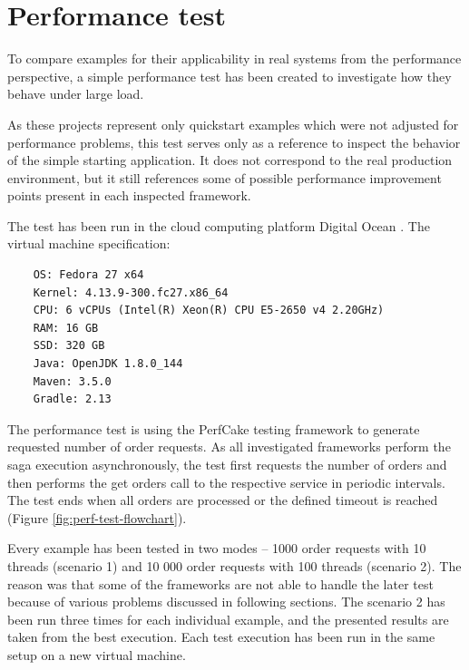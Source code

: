 \documentclass[oneside,
  digital, %
  table,   %
  lof,     %
  lot,     %
]{fithesis3}
\begin{document}
\section{Performance test}
\label{sec:perftest}

To compare examples for their applicability in real systems from the performance perspective, a simple performance test has been created to investigate how they behave under large load.

As these projects represent only quickstart examples which were not adjusted for performance problems, this test serves only as a reference to inspect the behavior of the simple starting application. It does not correspond to the real production environment, but it still references some of possible performance improvement points present in each inspected framework.

The test has been run in the cloud computing platform Digital Ocean \cite{digital-ocean}. The virtual machine specification:

\begin{verbatim}
    OS: Fedora 27 x64
    Kernel: 4.13.9-300.fc27.x86_64
    CPU: 6 vCPUs (Intel(R) Xeon(R) CPU E5-2650 v4 2.20GHz)
    RAM: 16 GB
    SSD: 320 GB
    Java: OpenJDK 1.8.0_144
    Maven: 3.5.0
    Gradle: 2.13
\end{verbatim}

The performance test is using the PerfCake \cite{perfcake} testing framework to generate requested number of order requests. As all investigated frameworks perform the saga execution asynchronously, the test first requests the number of orders and then performs the get orders call to the respective service in periodic intervals. The test ends when all orders are processed or the defined timeout is reached (Figure \ref{fig:perf-test-flowchart}).

Every example has been tested in two modes -- 1000 order requests with 10 threads (scenario 1) and 10 000 order requests with 100 threads (scenario 2). The reason was that some of the frameworks are not able to handle the later test because of various problems discussed in following sections. The scenario 2 has been run three times for each individual example, and the presented results are taken from the best execution. Each test execution has been run in the same setup on a new virtual machine.
\end{document}
